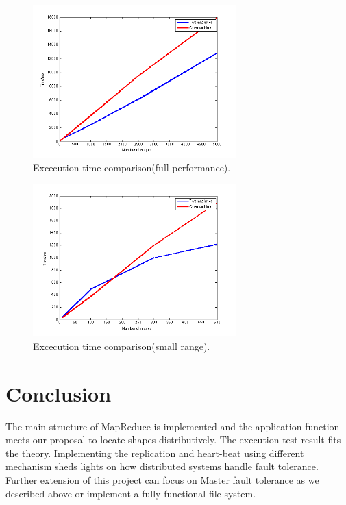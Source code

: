 \documentclass[12pt]{article}
\begin{document}
\begin{figure}[h!]
  
  \centering
    \includegraphics[width=0.7\textwidth]{large.png}
    \caption{Excecution time comparison(full performance).}
\end{figure}

\begin{figure}[h!]
  
  \centering
    \includegraphics[width=0.7\textwidth]{small.png}
    \caption{Excecution time comparison(small range).}
\end{figure}



\section {Conclusion}

The main structure of MapReduce is implemented and the application function meets our proposal to locate shapes distributively. The execution test result fits the theory. Implementing the replication and heart-beat using different mechanism sheds lights on how distributed systems handle fault tolerance. Further extension of this project can focus on Master fault tolerance as we described above or implement a fully functional file system. 
\end{document}
